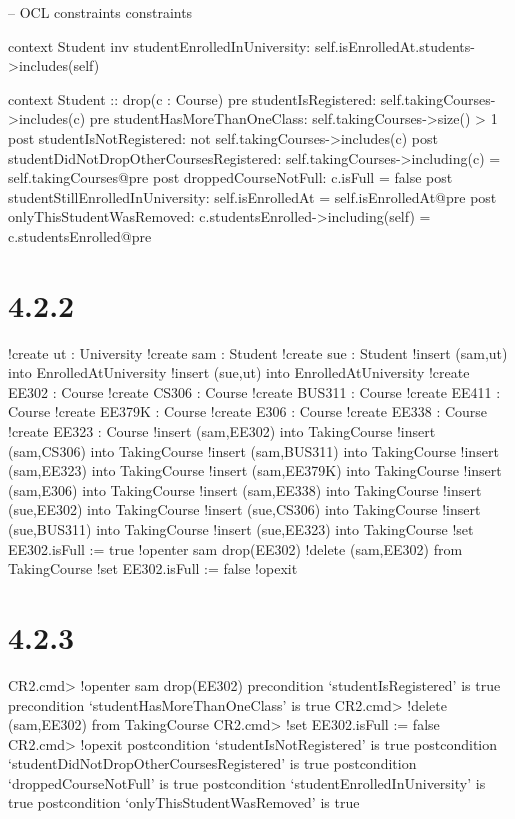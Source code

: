 \documentclass{article}
\begin{document}
-- OCL constraints
constraints

context Student
	inv studentEnrolledInUniversity: self.isEnrolledAt.students->includes(self)

context Student :: drop(c : Course)
	pre studentIsRegistered: self.takingCourses->includes(c)
	pre studentHasMoreThanOneClass: self.takingCourses->size() > 1
	post studentIsNotRegistered: not self.takingCourses->includes(c)
	post studentDidNotDropOtherCoursesRegistered: self.takingCourses->including(c) = self.takingCourses@pre
	post droppedCourseNotFull: c.isFull = false
	post studentStillEnrolledInUniversity: self.isEnrolledAt = self.isEnrolledAt@pre
	post onlyThisStudentWasRemoved: c.studentsEnrolled->including(self) = c.studentsEnrolled@pre
	
 \section*{4.2.2}
 
 !create ut : University
!create sam : Student
!create sue : Student
!insert (sam,ut) into EnrolledAtUniversity
!insert (sue,ut) into EnrolledAtUniversity
!create EE302 : Course
!create CS306 : Course
!create BUS311 : Course
!create EE411 : Course
!create EE379K : Course
!create E306 : Course
!create EE338 : Course
!create EE323 : Course
!insert (sam,EE302) into TakingCourse
!insert (sam,CS306) into TakingCourse
!insert (sam,BUS311) into TakingCourse
!insert (sam,EE323) into TakingCourse
!insert (sam,EE379K) into TakingCourse
!insert (sam,E306) into TakingCourse
!insert (sam,EE338) into TakingCourse
!insert (sue,EE302) into TakingCourse
!insert (sue,CS306) into TakingCourse
!insert (sue,BUS311) into TakingCourse
!insert (sue,EE323) into TakingCourse
!set EE302.isFull := true
!openter sam drop(EE302)
!delete (sam,EE302) from TakingCourse
!set EE302.isFull := false
!opexit

\section*{4.2.3}

CR2.cmd> !openter sam drop(EE302)
precondition `studentIsRegistered' is true
precondition `studentHasMoreThanOneClass' is true
CR2.cmd> !delete (sam,EE302) from TakingCourse
CR2.cmd> !set EE302.isFull := false
CR2.cmd> !opexit
postcondition `studentIsNotRegistered' is true
postcondition `studentDidNotDropOtherCoursesRegistered' is true
postcondition `droppedCourseNotFull' is true
postcondition `studentEnrolledInUniversity' is true
postcondition `onlyThisStudentWasRemoved' is true
 
\end{document}

